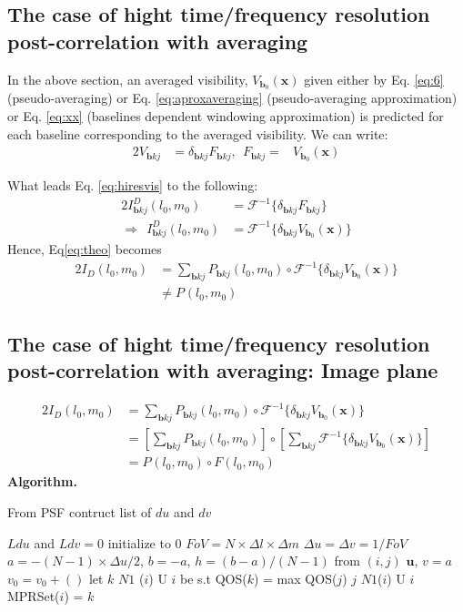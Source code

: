 \subsection{The case of hight time/frequency resolution post-correlation with averaging}
In the above section, an averaged visibility, $V_{\mathbf{b}_0}(\mathbf{x})$ given either by Eq. \ref{eq:6} (pseudo-averaging)
or Eq. \ref{eq:aproxaveraging} (pseudo-averaging approximation) or 
Eq. \ref{eq:xx} (baselines dependent windowing approximation) is predicted for each  baseline
corresponding to the averaged visibility. We can write:
\begin{alignat}{2}
V_{\mathbf{b}kj}&=\delta_{\mathbf{b}kj}F_{\mathbf{b}{kj}}, ~~
F_{\mathbf{b}kj}=& V_{\mathbf{b}_0}(\mathbf{x})
\end{alignat}

What leads Eq. \ref{eq:hiresvis} to the following:
\begin{alignat}{2}
I^{D}_{\mathbf{b}kj}(l_0,m_0)&= \mathcal{F}^{-1}\{\delta_{\mathbf{b}kj}F_{\mathbf{b}{kj}}\}\\ \Rightarrow ~~
I^{D}_{\mathbf{b}kj}(l_0,m_0)&=	\mathcal{F}^{-1}\{\delta_{\mathbf{b}kj}V_{\mathbf{b}_0}(\mathbf{x})\}
\end{alignat}
Hence, Eq\ref{eq:theo} becomes
\begin{alignat}{2}
I_{D}(l_0,m_0)&=\sum_{\mathbf{b} kj}P_{\mathbf{b}kj}(l_0,m_0)\circ \mathcal{F}^{-1}\{\delta_{\mathbf{b}kj}V_{\mathbf{b}_0}(\mathbf{x})\}\\
	      &\neq P_{}(l_0,m_0)
\end{alignat}
\subsection{The case of hight time/frequency resolution post-correlation with averaging: Image plane}
\begin{alignat}{2}
I_{D}(l_0,m_0)&=\sum_{\mathbf{b} kj}P_{\mathbf{b}kj}(l_0,m_0)\circ \mathcal{F}^{-1}\{\delta_{\mathbf{b}kj}V_{\mathbf{b}_0}(\mathbf{x})\}\\
	     &=[\sum_{\mathbf{b} kj}P_{\mathbf{b}kj}(l_0,m_0)]\circ [\sum_{\mathbf{b} kj}\mathcal{F}^{-1}\{\delta_{\mathbf{b}kj}V_{\mathbf{b}_0}(\mathbf{x})\}]\\
	     &=P_{}(l_0,m_0)\circ F(l_0,m_0)
\end{alignat}
{\bf Algorithm.}

\begin{algorithm}
\caption{From PSF contruct list of $du$ and $dv$}
\label{CHalgorithm}
\begin{algorithmic}[1]
\State $Ldu$ and $Ldv=0$ initialize to $0$
\State $FoV = N \times \Delta l \times \Delta m$
\State $\Delta u=\Delta v=1/FoV$
\State $a=-(N-1)\times \Delta u /2$, $b=-a$, $h=(b-a)/(N-1)$
\State from $(i,j)$ $\mathbf{u}$, $v=a$
\State $v_{0}=v_{0}+()$
\State let $k$  $N1$ ($i$) U {$i$} be s.t
\State QOS($k$) = max {QOS($j$) \textbar $j$  $N1$($i$)  U $i$}
\State MPRSet($i$) = $k$
\EndFor
\EndFor
\EndProcedure
\end{algorithmic}
\end{algorithm}


